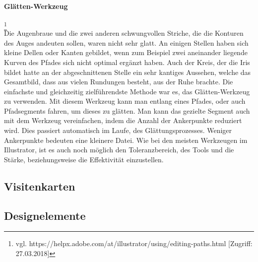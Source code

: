\paragraph{Glätten-Werkzeug}
\footnote{\label{} vgl. https://helpx.adobe.com/at/illustrator/using/editing-paths.html  [Zugriff: 27.03.2018]}
\leavevmode \\
Die Augenbraue und die zwei anderen schwungvollen Striche, die die Konturen des Auges andeuten sollen, waren nicht sehr glatt. An einigen Stellen haben sich kleine Dellen oder Kanten gebildet, wenn zum Beispiel zwei aneinander liegende Kurven des Pfades sich nicht optimal ergänzt haben. Auch der Kreis, der die Iris bildet hatte an der abgeschnittenen Stelle ein sehr kantiges Aussehen, welche das Gesamtbild, dass aus vielen Rundungen besteht, aus der Ruhe brachte. Die einfachste und gleichzeitig zielführendste Methode war es, das Glätten-Werkzeug zu verwenden. Mit diesem Werkzeug kann man entlang eines Pfades, oder auch Pfadsegments fahren, um dieses zu glätten. Man kann das gezielte Segment auch mit dem Werkzeug vereinfachen, indem die Anzahl der Ankerpunkte reduziert wird. Dies passiert automatisch im Laufe, des Glättungsprozesses. Weniger Ankerpunkte bedeuten eine kleinere Datei. Wie bei den meisten Werkzeugen im Illustrator, ist es auch noch möglich den Toleranzbereich, des Tools und die Stärke, beziehungsweise die Effektivität einzustellen.


\subsection{Visitenkarten}
\subsection{Designelemente}